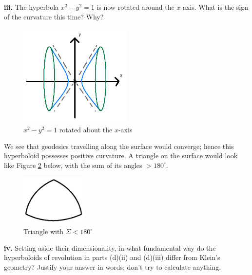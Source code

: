 \documentclass[a4paper]{article} %
\begin{document}
\pagebreak  %

\begin{framed}
\textbf{iii.} The hyperbola $x^2-y^2=1$ is now rotated around the $x$-axis. What is the sign of the curvature this time? Why?
\end{framed}

\begin{figure}[h]
\centering
\includegraphics[width=0.5\textwidth]{images/diii.png}
\caption{$x^2-y^2=1$ rotated about the $x$-axis}
\label{diii figure}
\end{figure}

We see that geodesics travelling along the surface would converge; hence this hyperboloid possesses positive curvature. A triangle on the surface would look like Figure \ref{pos curv triangle} below, with the sum of its angles $> 180^{\circ}$.

\begin{figure}[h]
\centering
\includegraphics[width=0.3\textwidth]{images/positiveCurvTriangle.png}
\caption{Triangle with $\Sigma<180^{\circ}$}
\label{pos curv triangle}
\end{figure}


\pagebreak  %

\begin{framed}
\textbf{iv.} Setting aside their dimensionality, in what fundamental way do the hyperboloids of revolution in parts (d)(ii) and (d)(iii) differ from Klein's geometry? Justify your answer in words; don’t try to calculate anything.
\end{framed}
\end{document}
